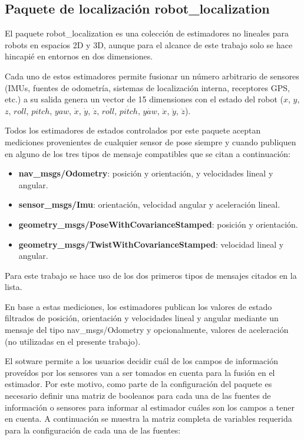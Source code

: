 
\subsection{Paquete de localización robot\_localization}\label{sec:robotLocalization}

El paquete robot\_localization es una colección de estimadores no lineales para robots en espacios 2D y 3D, aunque para el alcance de este trabajo solo se hace hincapié en entornos en dos dimensiones.

Cada uno de estos estimadores permite fusionar un número arbitrario de sensores (IMUs, fuentes de odometría, sistemas de localización interna, receptores GPS, etc.) a su salida genera un vector de 15 dimensiones con el estado del robot ($x$, $y$, $z$, $roll$, $pitch$, $yaw$, $\dot{x}$, $\dot{y}$, $\dot{z}$, $\dot{roll}$, $\dot{pitch}$, $\dot{yaw}$, $\ddot{x}$, $\ddot{y}$, $\ddot{z}$).

Todos los estimadores de estados controlados por este paquete aceptan mediciones provenientes de cualquier sensor de pose siempre y cuando publiquen en alguno de los tres tipos de mensaje compatibles que se citan a continuación:

\begin{itemize}
    \item \textbf{nav\_msgs/Odometry}: posición y orientación, y velocidades lineal y angular.
    \item \textbf{sensor\_msgs/Imu}: orientación, velocidad angular y aceleración lineal.
    \item \textbf{geometry\_msgs/PoseWithCovarianceStamped}: posición y orientación.
    \item \textbf{geometry\_msgs/TwistWithCovarianceStamped}: velocidad lineal y angular.
\end{itemize}

Para este trabajo se hace uso de los dos primeros tipos de mensajes citados en la lista.

En base a estas mediciones, los estimadores publican los valores de estado filtrados de posición, orientación y velocidades lineal y angular mediante un mensaje del tipo nav\_msgs/Odometry y opcionalmente, valores de aceleración (no utilizadas en el presente trabajo).

El sotware permite a los usuarios decidir cuál de los campos de información proveídos por los sensores van a ser tomados en cuenta para la fusión en el estimador. Por este motivo, como parte de la configuración del paquete es necesario definir una matriz de booleanos para cada una de las fuentes de información o sensores para informar al estimador cuáles son los campos a tener en cuenta. A continuación se muestra la matriz completa de variables requerida para la configuración de cada una de las fuentes:

